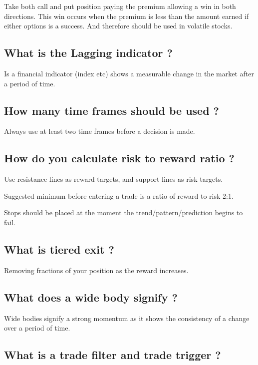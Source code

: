 \documentclass[11pt]{scrartcl} %
\begin{document}
Take both call and put position paying the premium allowing a win in both directions. This win occurs
when the premium is less than the amount earned if either options is a success. And therefore should be
used in volatile stocks.

\subsection{What is the Lagging indicator ?}

Is a financial indicator (index etc) shows a measurable change in the market after a period of time.

\subsection{How many time frames should be used ?}

Always use at least two time frames before a decision is made.

\subsection{How do you calculate risk to reward ratio ?}

Use resistance lines as reward targets, and support lines as risk targets.

Suggested minimum before entering a trade is a ratio of reward to risk 2:1.

Stops should be placed at the moment the trend/pattern/prediction begins to fail.

\subsection{What is tiered exit ?}

Removing fractions of your position as the reward increases. 

\subsection{What does a wide body signify ?}

Wide bodies signify a strong momentum as it shows the consistency of a change over a period of time.

\subsection{What is a trade filter and trade trigger ?}
\end{document}
